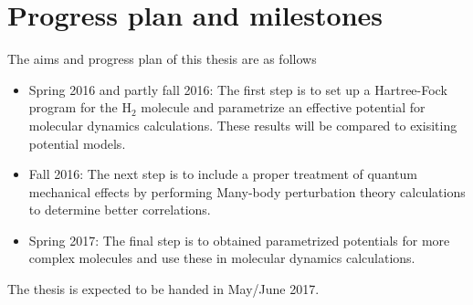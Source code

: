 \documentclass[10pt]{article}
\begin{document}
\section*{Progress plan and milestones}
The aims and progress plan of this thesis are as follows
\begin{itemize}
\item Spring 2016 and partly fall 2016:  The first step is to set up a Hartree-Fock program for the H$_2$ molecule and parametrize an effective potential for molecular dynamics calculations. These results will be compared to exisiting potential models.
\item Fall 2016:  The next step is to include a proper treatment of quantum mechanical effects by performing Many-body perturbation theory calculations to determine better correlations.
\item Spring 2017: The final step is to obtained parametrized potentials for more complex molecules and use these
in molecular dynamics calculations.
\end{itemize}
 
The thesis is expected to be handed in May/June 2017.
\end{document}
